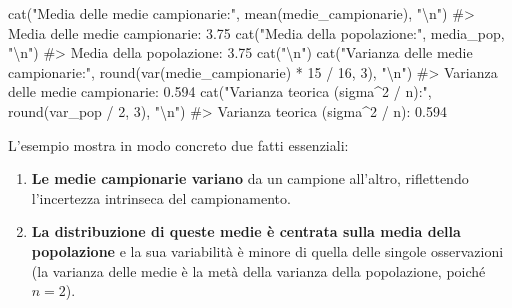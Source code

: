 \documentclass[
  italian,
  letterpaper,
  a4paper,
  11pt,
  open=any]{scrbook}
\newenvironment{Shaded}{\begin{snugshade}}{\end{snugshade}}
\newcommand{\CommentTok}[1]{\textcolor[rgb]{0.37,0.37,0.37}{#1}}
\newcommand{\DecValTok}[1]{\textcolor[rgb]{0.68,0.00,0.00}{#1}}
\newcommand{\FunctionTok}[1]{\textcolor[rgb]{0.28,0.35,0.67}{#1}}
\newcommand{\NormalTok}[1]{\textcolor[rgb]{0.00,0.23,0.31}{#1}}
\newcommand{\SpecialCharTok}[1]{\textcolor[rgb]{0.37,0.37,0.37}{#1}}
\newcommand{\StringTok}[1]{\textcolor[rgb]{0.13,0.47,0.30}{#1}}
\providecommand{\tightlist}{%
  \setlength{\itemsep}{0pt}\setlength{\parskip}{0pt}}
\theoremstyle{plain}
\theoremstyle{definition}
\theoremstyle{definition}
\theoremstyle{remark}
\begin{document}
\begin{Shaded}
\begin{Highlighting}[]
\FunctionTok{cat}\NormalTok{(}\StringTok{"Media delle medie campionarie:"}\NormalTok{, }\FunctionTok{mean}\NormalTok{(medie\_campionarie), }\StringTok{"}\SpecialCharTok{\textbackslash{}n}\StringTok{"}\NormalTok{)}
\CommentTok{\#\textgreater{} Media delle medie campionarie: 3.75}
\FunctionTok{cat}\NormalTok{(}\StringTok{"Media della popolazione:"}\NormalTok{, media\_pop, }\StringTok{"}\SpecialCharTok{\textbackslash{}n}\StringTok{"}\NormalTok{)}
\CommentTok{\#\textgreater{} Media della popolazione: 3.75}
\FunctionTok{cat}\NormalTok{(}\StringTok{"}\SpecialCharTok{\textbackslash{}n}\StringTok{"}\NormalTok{)}
\FunctionTok{cat}\NormalTok{(}\StringTok{"Varianza delle medie campionarie:"}\NormalTok{, }\FunctionTok{round}\NormalTok{(}\FunctionTok{var}\NormalTok{(medie\_campionarie) }\SpecialCharTok{*} \DecValTok{15} \SpecialCharTok{/} \DecValTok{16}\NormalTok{, }\DecValTok{3}\NormalTok{), }\StringTok{"}\SpecialCharTok{\textbackslash{}n}\StringTok{"}\NormalTok{)}
\CommentTok{\#\textgreater{} Varianza delle medie campionarie: 0.594}
\FunctionTok{cat}\NormalTok{(}\StringTok{"Varianza teorica (sigma\^{}2 / n):"}\NormalTok{, }\FunctionTok{round}\NormalTok{(var\_pop }\SpecialCharTok{/} \DecValTok{2}\NormalTok{, }\DecValTok{3}\NormalTok{), }\StringTok{"}\SpecialCharTok{\textbackslash{}n}\StringTok{"}\NormalTok{)}
\CommentTok{\#\textgreater{} Varianza teorica (sigma\^{}2 / n): 0.594}
\end{Highlighting}
\end{Shaded}

L'esempio mostra in modo concreto due fatti essenziali:

\begin{enumerate}
\def\labelenumi{\arabic{enumi}.}
\tightlist
\item
  \textbf{Le medie campionarie variano} da un campione all'altro,
  riflettendo l'incertezza intrinseca del campionamento.
\item
  \textbf{La distribuzione di queste medie è centrata sulla media della
  popolazione} e la sua variabilità è minore di quella delle singole
  osservazioni (la varianza delle medie è la metà della varianza della
  popolazione, poiché \(n = 2\)).
\end{enumerate}
\end{document}
